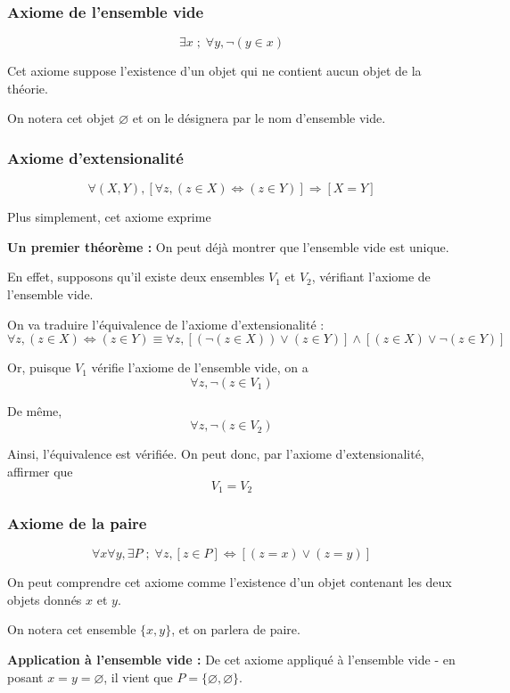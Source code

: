\documentclass{article}
\begin{document}
\subsubsection{Axiome de l'ensemble vide}
$$\boxed{\exists x \; ; \; \forall y, \neg(y \in x)}$$

Cet axiome suppose l'existence d'un objet qui ne contient aucun objet de la théorie.

On notera cet objet $\varnothing$ et on le désignera par le nom d'ensemble vide.

\subsubsection{Axiome d'extensionalité}
$$\boxed{\forall (X,Y), [\forall z,(z \in X) \Leftrightarrow (z \in Y)] \Rightarrow [X=Y]}$$

Plus simplement, cet axiome exprime 

\textbf{Un premier théorème :}
On peut déjà montrer que l'ensemble vide est unique.

En effet, supposons qu'il existe deux ensembles $V_1$ et $V_2$, vérifiant l'axiome de l'ensemble vide.

On va traduire l'équivalence de l'axiome d'extensionalité :
$$\forall z,(z \in X) \Leftrightarrow (z \in Y) \equiv \forall z,[(\neg(z\in X))\lor(z \in Y)]\wedge [(z \in X) \lor \neg(z \in Y)]$$

Or, puisque $V_1$ vérifie l'axiome de l'ensemble vide, on a 
$$\forall z, \neg(z \in V_1)$$

De même, 
$$\forall z, \neg(z \in V_2)$$

Ainsi, l'équivalence est vérifiée. On peut donc, par l'axiome d'extensionalité, affirmer que 
$$V_1 = V_2$$

\subsubsection{Axiome de la paire}

$$\boxed{\forall x \forall y, \exists P \; ; \; \forall z, [z \in P] \Leftrightarrow [(z = x) \lor (z = y)]}$$

On peut comprendre cet axiome comme l'existence d'un objet contenant les deux objets donnés $x$ et $y$.

On notera cet ensemble $\{ x,y \}$, et on parlera de paire.

\textbf{Application à l'ensemble vide :}
De cet axiome appliqué à l'ensemble vide - en posant $x = y = \varnothing$, il vient que $P = \{\varnothing ,\varnothing \}$.
\end{document}
